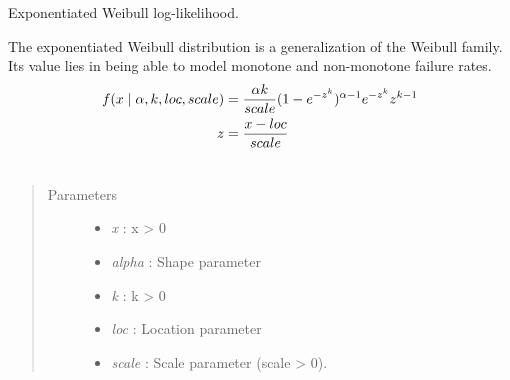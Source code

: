 \documentclass[letterpaper,10pt,english]{sphinxmanual}
\begin{document}
\begin{fulllineitems}
\label{distributions:pymc.distributions.exponweib_like}
Exponentiated Weibull log-likelihood.

The exponentiated Weibull distribution is a generalization of the Weibull
family. Its value lies in being able to model monotone and non-monotone
failure rates.
\begin{gather}
\begin{split}f(x \mid \alpha,k,loc,scale)  & = \frac{\alpha k}{scale} (1-e^{-z^k})^{\alpha-1} e^{-z^k} z^{k-1} \\
z & = \frac{x-loc}{scale}\end{split}\notag\\\begin{split}\end{split}\notag
\end{gather}\begin{quote}\begin{description}
\item[{Parameters }] \leavevmode\begin{itemize}
\item {} 
\emph{x} : x \textgreater{} 0

\item {} 
\emph{alpha} : Shape parameter

\item {} 
\emph{k} : k \textgreater{} 0

\item {} 
\emph{loc} : Location parameter

\item {} 
\emph{scale} : Scale parameter (scale \textgreater{} 0).

\end{itemize}

\end{description}\end{quote}

\end{fulllineitems}

\end{document}
